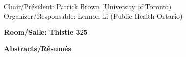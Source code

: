 \newpage
{}
\begin{center}{\large Chair/Président: Patrick Brown (University of Toronto)\protect\\[5pt]
Organizer/Responsable: Lennon Li (Public Health Ontario)}
\end{center}
\begin{center}\large\bfseries Room/Salle: Thistle 325\end{center}
\label{abs-sid:smp}
\begin{center}{\large\bfseries Abstracts/R\'esum\'es}
\end{center}
\def\whenwhere{[Monday May 30 / lundi 30 mai, 10:20]\\}
